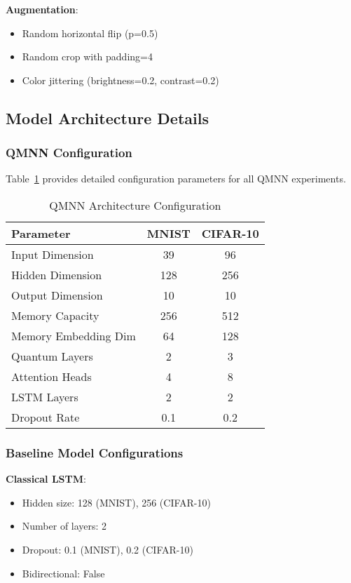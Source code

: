 \textbf{Augmentation}:
\begin{itemize}
    \item Random horizontal flip (p=0.5)
    \item Random crop with padding=4
    \item Color jittering (brightness=0.2, contrast=0.2)
\end{itemize}

\subsection{Model Architecture Details}

\subsubsection{QMNN Configuration}

Table~\ref{tab:qmnn_config} provides detailed configuration parameters for all QMNN experiments.

\begin{table}[htbp]
    \centering
    \caption{QMNN Architecture Configuration}
    \label{tab:qmnn_config}
    \begin{tabular}{lcc}
        \toprule
        Parameter & MNIST & CIFAR-10 \\
        \midrule
        Input Dimension & 39 & 96 \\
        Hidden Dimension & 128 & 256 \\
        Output Dimension & 10 & 10 \\
        Memory Capacity & 256 & 512 \\
        Memory Embedding Dim & 64 & 128 \\
        Quantum Layers & 2 & 3 \\
        Attention Heads & 4 & 8 \\
        LSTM Layers & 2 & 2 \\
        Dropout Rate & 0.1 & 0.2 \\
        \bottomrule
    \end{tabular}
\end{table}

\subsubsection{Baseline Model Configurations}

\textbf{Classical LSTM}:
\begin{itemize}
    \item Hidden size: 128 (MNIST), 256 (CIFAR-10)
    \item Number of layers: 2
    \item Dropout: 0.1 (MNIST), 0.2 (CIFAR-10)
    \item Bidirectional: False
\end{itemize}

